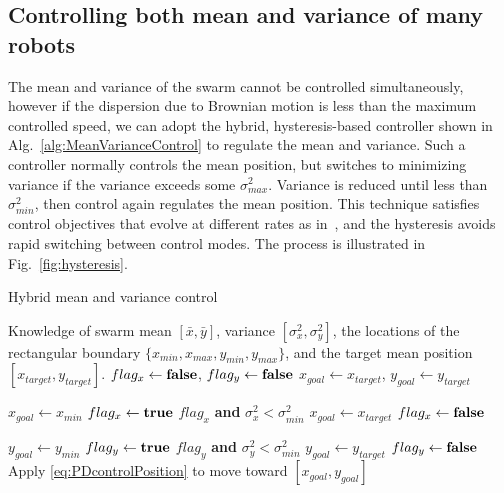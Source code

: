 \subsection{Controlling both mean and variance of many robots}

The mean and variance of the swarm cannot be controlled simultaneously, however if the dispersion due to Brownian motion is less than the maximum controlled speed, we can adopt the hybrid, hysteresis-based controller shown in Alg.~\ref{alg:MeanVarianceControl} to regulate the mean and variance.  Such a controller normally controls the mean position, but switches to minimizing variance if the variance exceeds some $\sigma_{max}^2$. 
 Variance is reduced until less than $\sigma_{min}^2$, then control again regulates the mean position. 
 This technique satisfies control objectives that evolve at different rates as in~\cite{kloetzer2007temporal}, and the hysteresis avoids rapid switching between control modes. The process is illustrated in Fig.~\ref{fig:hysteresis}. 


\begin{algorithm}
\caption{Hybrid mean and variance control}\label{alg:MeanVarianceControl}
\begin{algorithmic}[1]
\Require Knowledge of swarm mean $[\bar{x},\bar{y}]$, variance $[\sigma_x^2, \sigma_y^2]$, the locations of the rectangular boundary $\{x_{min}, x_{max}, y_{min}, y_{max}\}$, and the target mean position $[x_{target},y_{target}]$.%
\State $flag_x \gets \textbf{false}$,  $flag_y \gets \textbf{false}$ 
\State $x_{goal} \gets  x_{target}$, $y_{goal} \gets y_{target}$
\Loop

\State $x_{goal}  \gets x_{min}$
\State $flag_x  \gets \textbf{true}$
 {$flag_x$ \textbf{and} $\sigma_x^2 < \sigma_{min}^2$}
\State $x_{goal}  \gets  x_{target}$
\State $flag_x  \gets  \textbf{false}$
\EndIf

\State $y_{goal}  \gets y_{min}$
\State $flag_y  \gets \textbf{true}$
 {$flag_y$ \textbf{and} $\sigma_y^2 < \sigma_{min}^2$}
\State $y_{goal}  \gets  y_{target}$
\State $flag_y  \gets \textbf{false}$
\EndIf
\State Apply \eqref{eq:PDcontrolPosition} to move toward $[x_{goal}, y_{goal}]$
\EndLoop
\end{algorithmic}
\end{algorithm}


